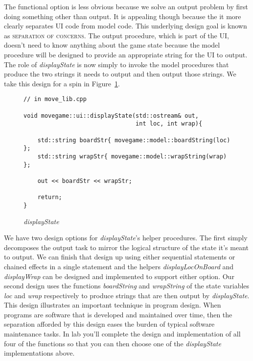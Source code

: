 \documentclass[nobib]{tufte-handout}
\begin{document}
The functional option is less obvious because we solve an output problem by first doing something other than output. It is appealing though because the it more clearly separates UI code from model code. This underlying design goal is known as \textsc{separation of concerns}. The output procedure, which is part of the UI, doesn't need to know anything about the game state because the model procedure will be designed to provide an appropriate string for the UI to output. The role of \textit{displayState} is now simply to invoke the model procedures that produce the two strings it needs to output and then output those strings. We take this design for a spin in Figure~\ref{fig:display-func}.

\begin{figure}[!htbp]
\begin{lstlisting}
// in move_lib.cpp

void movegame::ui::displayState(std::ostream& out,
	                            int loc, int wrap){

	std::string boardStr{ movegame::model::boardString(loc) };
	std::string wrapStr{ movegame::model::wrapString(wrap) };

	out << boardStr << wrapStr;

	return;
}

\end{lstlisting}
\caption{\textit{displayState} }
\label{fig:display-func}
\end{figure}

We have two design options for \textit{displayState}'s helper procedures. The first simply decomposes the output task to mirror the logical structure of the state it's meant to output. We can finish that design up using either sequential statements or chained effects in a single statement and the helpers \textit{displayLocOnBoard} and \textit{displayWrap} can be designed and implemented to support either option. Our second design uses the functions \textit{boardString} and \textit{wrapString} of the state variables \textit{loc} and \textit{wrap} respectively to produce strings that are then output by \textit{displayState}. This design illustrates an important technique in program design. When programs are software that is developed and maintained over time, then the separation afforded by this design eases the burden of typical software maintenance tasks. In lab you'll complete the design and implementation of all four of the functions so that you can then choose one of the \textit{displayState} implementations above.
\end{document}
